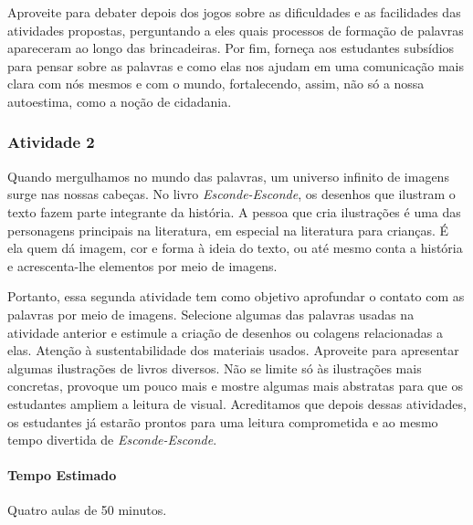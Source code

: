 \documentclass[11pt]{extarticle}
\begin{document}
Aproveite para debater depois dos jogos sobre as dificuldades e as facilidades das atividades propostas, perguntando a eles quais processos de formação de palavras apareceram ao longo das brincadeiras. Por fim, forneça aos estudantes subsídios para pensar sobre as palavras e como elas nos ajudam em uma comunicação mais clara com nós mesmos e com o mundo, fortalecendo, assim, não só a nossa autoestima, como a noção de cidadania.

\subsubsection{Atividade 2}


Quando mergulhamos no mundo das palavras, um universo infinito de imagens surge nas nossas cabeças. No livro \textit{Esconde-Esconde}, os desenhos que ilustram o texto fazem parte integrante da história. A pessoa que cria ilustrações é uma das personagens principais na literatura, em especial na literatura para crianças. É ela quem dá imagem, cor e forma à ideia do texto, ou até mesmo conta a história e acrescenta-lhe elementos por meio de imagens. 

Portanto, essa segunda atividade tem como objetivo aprofundar o contato com as palavras por meio de imagens. Selecione algumas das palavras usadas na atividade anterior e estimule a criação de desenhos ou colagens relacionadas a elas. Atenção à sustentabilidade dos materiais usados. Aproveite para apresentar algumas ilustrações de livros diversos. Não se limite só às ilustrações mais concretas, provoque um pouco mais e mostre algumas mais abstratas para que os estudantes ampliem a leitura de visual. Acreditamos que depois dessas atividades, os estudantes já estarão prontos para uma leitura comprometida e ao mesmo tempo divertida de \textit{Esconde-Esconde}. 

\paragraph{Tempo Estimado} Quatro aulas de 50 minutos. 
\end{document}
